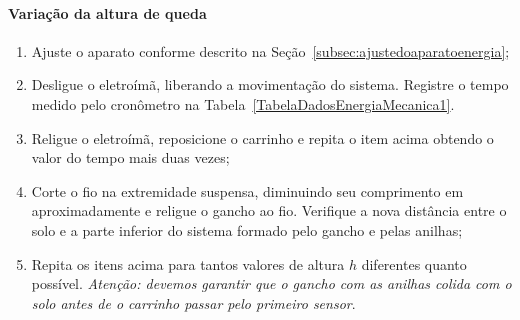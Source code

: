 \paragraph{Variação da altura de queda}
\begin{enumerate}
    \item Ajuste o aparato conforme descrito na Seção~\ref{subsec:ajustedoaparatoenergia};
	\item Desligue o eletroímã, liberando a movimentação do sistema. Registre o tempo medido pelo cronômetro na Tabela~\ref{TabelaDadosEnergiaMecanica1}.
	\item Religue o eletroímã, reposicione o carrinho e repita o item acima obtendo o valor do tempo mais duas vezes;
    \item Corte o fio na extremidade suspensa, diminuindo seu comprimento em aproximadamente  e religue o gancho ao fio. Verifique a nova distância entre o solo e a parte inferior do sistema formado pelo gancho e pelas anilhas;
	\item Repita os itens acima para tantos valores de altura $h$ diferentes quanto possível. \emph{Atenção: devemos garantir que o gancho com as anilhas colida com o solo antes de o carrinho passar pelo primeiro sensor}.
\end{enumerate}

\cleardoublepage


\vspace{15mm}

\begin{fullwidth}
\noindent{}
\vspace{5mm}

\noindent{}

\noindent{}

\noindent{}

\noindent{}

\noindent{}
\end{fullwidth}

